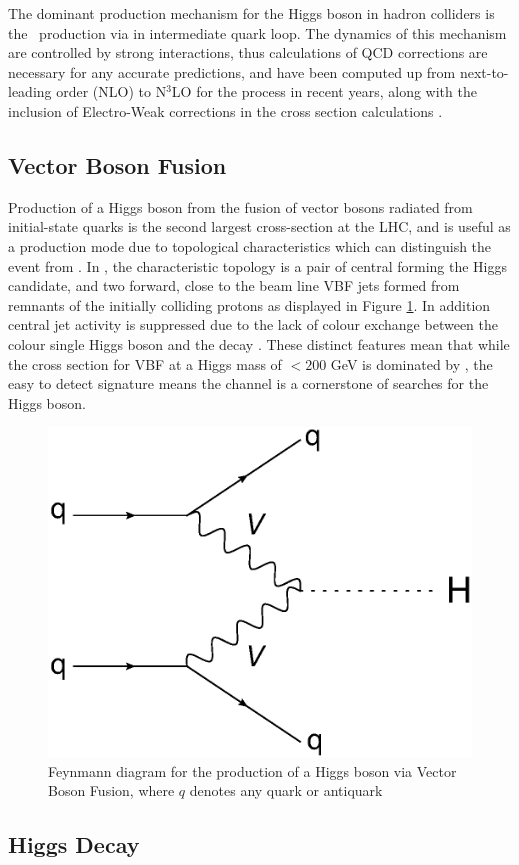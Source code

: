 		The dominant production mechanism for the Higgs boson in hadron colliders is the \ggF\, production via in intermediate quark loop. The dynamics of this mechanism are controlled by strong interactions, thus calculations of QCD corrections are necessary for any accurate predictions, and have been computed up from next-to-leading order (NLO) to N$^3$LO for the \ggF process in recent years, along with the inclusion of Electro-Weak corrections in the cross section calculations \cite{LHCHiggsCS}.

	\subsection{Vector Boson Fusion}
	\label{t:VBF}

		Production of a Higgs boson from the fusion of vector bosons radiated from initial-state quarks is the second largest cross-section at the LHC, and is useful as a production mode due to topological characteristics which can distinguish the event from \ggF. In \VBFHBB, the characteristic topology is a pair of
		central \bjets forming the Higgs candidate, and two forward, close to the beam line VBF jets formed from remnants of the initially colliding protons as displayed in Figure \ref{fig:T:vbf}. In addition central jet activity is suppressed due to the lack of colour exchange between the colour single Higgs boson and the decay \bquarks \cite{VBF2004}.  These distinct features mean that while the cross section for VBF at a Higgs mass of $< 200$ GeV is dominated by \ggF, the easy to detect signature means the channel is a cornerstone of searches for the Higgs boson.

		\begin{figure}[h]
			\centering
			\includegraphics[width=0.4\linewidth]{T/FIGS/vbf}
			\caption{Feynmann diagram for the production of a Higgs boson via Vector Boson Fusion, where $q$ denotes any quark or antiquark}
			\label{fig:T:vbf}
		\end{figure}


	\subsection{Higgs Decay}

